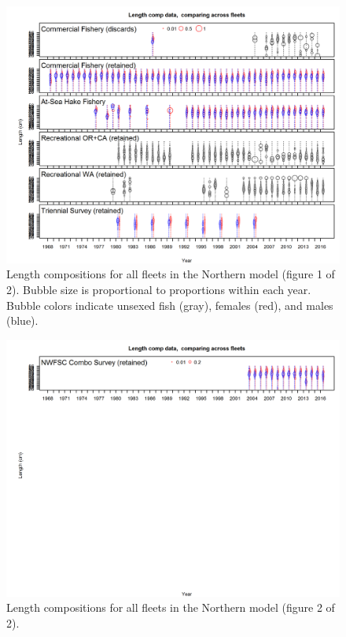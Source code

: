 \documentclass[12pt,]{article}
\begin{document}
\begin{figure}[htbp]
\centering
\includegraphics{r4ss/plots_mod1/comp_lendat__page1_multi-fleet_comparison.png}
\caption{Length compositions for all fleets in the Northern model
(figure 1 of 2). Bubble size is proportional to proportions within each
year. Bubble colors indicate unsexed fish (gray), females (red), and
males (blue).\label{fig:comp_length_bubble_mod1_page1}}
\end{figure}

\begin{figure}[htbp]
\centering
\includegraphics{r4ss/plots_mod1/comp_lendat__page2_multi-fleet_comparison.png}
\caption{Length compositions for all fleets in the Northern model
(figure 2 of 2). \label{fig:comp_length_bubble_mod1_page2}}
\end{figure}
\end{document}

